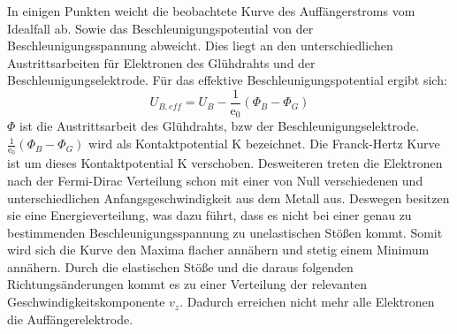 In einigen Punkten weicht die beobachtete Kurve des Auffängerstroms vom Idealfall ab.
Sowie das Beschleunigungspotential von der Beschleunigungsspannung abweicht.
Dies liegt an den unterschiedlichen Austrittsarbeiten für Elektronen des Glühdrahts und der Beschleunigungselektrode.
Für das effektive Beschleunigungspotential ergibt sich:
\begin{equation}
    U_{B,eff} = U_B - \frac{1}{\text{e}_0}(\Phi_B - \Phi_G)
    \label{eqn:gl5}
\end{equation}
$\Phi$ ist die Austrittsarbeit des Glühdrahts, bzw der Beschleunigungselektrode.
$\frac{1}{\text{e}_0}(\Phi_B - \Phi_G)$ wird als Kontaktpotential K bezeichnet.
Die Franck-Hertz Kurve ist um dieses Kontaktpotential K verschoben.
Desweiteren treten die Elektronen nach der Fermi-Dirac Verteilung schon mit einer von Null verschiedenen und unterschiedlichen Anfangsgeschwindigkeit aus dem Metall aus.
Deswegen besitzen sie eine Energieverteilung, was dazu führt, dass es nicht bei einer genau zu bestimmenden Beschleunigungsspannung zu unelastischen Stößen kommt.
Somit wird sich die Kurve den Maxima flacher annähern und stetig einem Minimum annähern.
Durch die elastischen Stöße und die daraus folgenden Richtungsänderungen kommt es zu einer Verteilung  der relevanten Geschwindigkeitskomponente $v_z$.
Dadurch erreichen nicht mehr alle Elektronen die Auffängerelektrode.